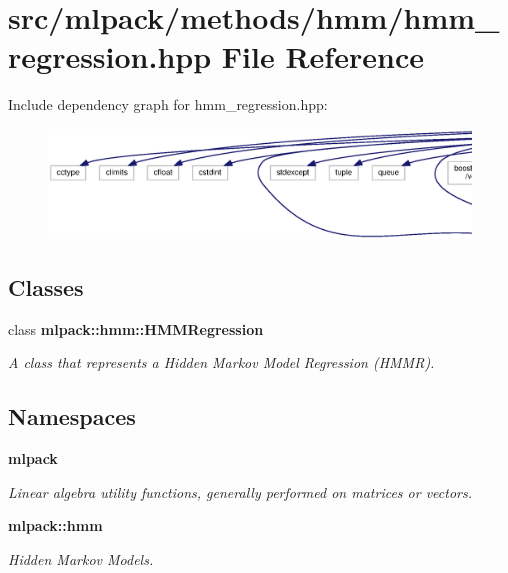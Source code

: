 \section{src/mlpack/methods/hmm/hmm\+\_\+regression.hpp File Reference}
\label{hmm__regression_8hpp}
Include dependency graph for hmm\+\_\+regression.\+hpp\+:
\nopagebreak
\begin{figure}[H]
\begin{center}
\leavevmode
\includegraphics[width=350pt]{hmm__regression_8hpp__incl}
\end{center}
\end{figure}
\subsection*{Classes}
\begin{DoxyCompactItemize}
\item 
class {\bf mlpack\+::hmm\+::\+H\+M\+M\+Regression}
\begin{DoxyCompactList}\small\item\em A class that represents a Hidden Markov Model Regression (H\+M\+MR). \end{DoxyCompactList}\end{DoxyCompactItemize}
\subsection*{Namespaces}
\begin{DoxyCompactItemize}
\item 
 {\bf mlpack}
\begin{DoxyCompactList}\small\item\em Linear algebra utility functions, generally performed on matrices or vectors. \end{DoxyCompactList}\item 
 {\bf mlpack\+::hmm}
\begin{DoxyCompactList}\small\item\em Hidden Markov Models. \end{DoxyCompactList}\end{DoxyCompactItemize}



